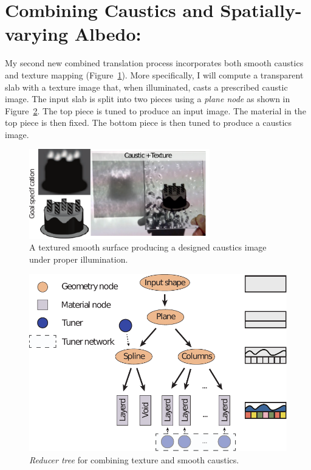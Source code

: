 \section{Combining Caustics and Spatially-varying Albedo:}
My second new combined translation process incorporates both smooth caustics and texture mapping
(Figure~\ref{fig:cake}).
More specifically, I will compute a transparent slab with a texture image that, when illuminated, casts a prescribed caustic image.
The input slab is split into two pieces using a \emph{plane node} as shown in Figure~\ref{fig:treeTexSpline}.
The top piece is tuned to produce an input image. The material in the top piece is then fixed. The bottom piece is then tuned to produce a caustics image.
\begin{figure}
\centering
\includegraphics[width=0.7\textwidth]{figure/cake.pdf}
\caption {A textured smooth surface producing a designed caustics image under proper illumination.}
\label{fig:cake}
\end{figure}

\begin{figure}
\centering
\includegraphics[scale=0.7]{figure/treeTexSpline.pdf}
\caption {\emph{Reducer tree} for combining texture and smooth caustics.
}
\label{fig:treeTexSpline}
\end{figure}

